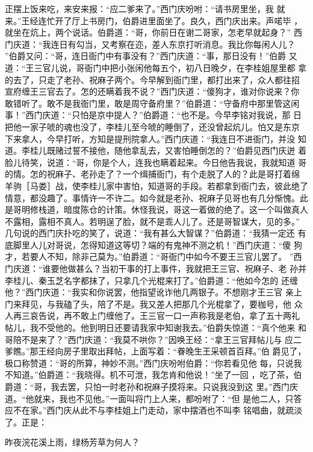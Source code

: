 正摆上饭来吃，来安来报：“应二爹来了。”西门庆吩咐：“请书房里坐，我
就来。”王经连忙开了厅上书房门，伯爵进里面坐了。良久，西门庆出来。声喏毕
，就坐在炕上，两个说话。伯爵道：“哥，你前日在谢二哥家，怎老早就起身？”
西门庆道：“我连日有勾当，又考察在迩，差人东京打听消息。我比你每闲人儿？
”伯爵又问：“哥，连日衙门中有事没有？”西门庆道：“事，那日没有！”伯爵
又道：“王三官儿说，哥衙门中把小张闲他每五个，初八日晚夕，在李桂姐屋里都
拿的去了，只走了老孙、祝麻子两个。今早解到衙门里，都打出来了，众人都往招
宣府缠王三官去了。怎的还瞒着我不说？”西门庆道：“傻狗才，谁对你说来？你
敢错听了。敢不是我衙门里，敢是周守备府里？”伯爵道：“守备府中那里管这闲
事！”西门庆道：“只怕是京中提人？”伯爵道：“也不是。今早李铭对我说，那
日把他一家子唬的魂也没了，李桂儿至今唬的睡倒了，还没曾起炕儿。怕又是东京
下来拿人，今早打听，方知是提刑院拿人。”西门庆道：“我连日不进衙门，并没
知道。李桂儿既赌过誓不接他，随他拿乱去，又害怕睡倒怎的？”伯爵见西门庆迸
着脸儿待笑，说道：“哥，你是个人，连我也瞒着起来。今日他告我说，我就知道
哥的情。怎的祝麻子、老孙走了？一个缉捕衙门，有个走脱了人的？此是哥打着绵
羊驹［马娄］战，使李桂儿家中害怕，知道哥的手段。若都拿到衙门去，彼此绝了
情意，都没趣了。事情许一不许二。如今就是老孙、祝麻子见哥也有几分惭愧。此
是哥明修栈道，暗度陈仓的计策。休怪我说，哥这一着做的绝了。这一个叫做真人
不露相，露相不真人。若明逞了脸，就不是乖人儿了。还是哥智谋大，见的多。”
几句说的西门庆扑吃的笑了，说道：“我有甚么大智谋？”伯爵道：“我猜一定还
有底脚里人儿对哥说，怎得知道这等切？端的有鬼神不测之机！”西门庆道：“傻
狗才，若要人不知，除非己莫为。”伯爵道：“哥衙门中如今不要王三官儿罢了。
”西门庆道：“谁要他做甚么？当初干事的打上事件，我就把王三官、祝麻子、老
孙并李桂儿、秦玉芝名字都抹了，只拿几个光棍来打了。”伯爵道：“他如今怎的
还缠他？”西门庆道：“我实和你说罢，他指望讹诈他几两银子。不想刚才王三官
亲上门来拜见，与我磕了头，陪了不是。我又差人把那几个光棍拿了，要枷号，他
众人再三哀告说，再不敢上门缠他了。王三官一口一声称我是老伯，拿了五十两礼
帖儿，我不受他的。他到明日还要请我家中知谢我去。”伯爵失惊道：“真个他来
和哥陪不是来了？”西门庆道：“我莫不哄你？”因唤王经：“拿王三官拜帖儿与
应二爹瞧。”那王经向房子里取出拜帖，上面写着：“眷晚生王采顿首百拜。”伯
爵见了，极口称赞道：“哥的所算，神妙不测。”西门庆吩咐伯爵：“你若看见他
每，只说我不知道。”伯爵道：“我晓得。机不可泄，我怎肯和他说！”坐了一回
，吃了茶，伯爵道：“哥，我去罢，只怕一时老孙和祝麻子摸将来。只说我没到这
里。”西门庆道。“他就来，我也不见他。”一面叫将门上人来，都吩咐了：“但
是他二人，只答应不在家。”西门庆从此不与李桂姐上门走动，家中摆酒也不叫李
铭唱曲，就疏淡了。正是：

昨夜浣花溪上雨，绿杨芳草为何人？